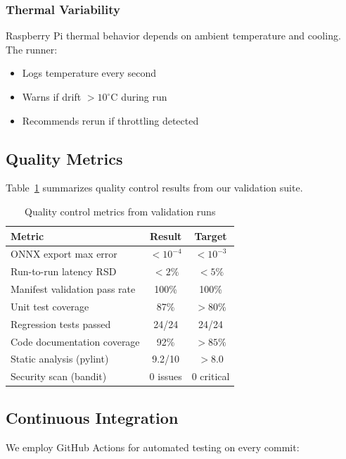 \documentclass[review]{elsarticle}
\begin{document}
\subsubsection{Thermal Variability}

Raspberry Pi thermal behavior depends on ambient temperature and cooling. The runner:

\begin{itemize}
\item Logs temperature every second
\item Warns if drift $> 10^\circ$C during run
\item Recommends rerun if throttling detected
\end{itemize}

\subsection{Quality Metrics}

Table~\ref{tab:quality-metrics} summarizes quality control results from our validation suite.

\begin{table}[h]
\centering
\caption{Quality control metrics from validation runs}
\label{tab:quality-metrics}
\begin{tabular}{lcc}
\toprule
\textbf{Metric} & \textbf{Result} & \textbf{Target} \\
\midrule
ONNX export max error & $< 10^{-4}$ & $< 10^{-3}$ \\
Run-to-run latency RSD & $< 2\%$ & $< 5\%$ \\
Manifest validation pass rate & 100\% & 100\% \\
Unit test coverage & 87\% & $> 80\%$ \\
Regression tests passed & 24/24 & 24/24 \\
Code documentation coverage & 92\% & $> 85\%$ \\
Static analysis (pylint) & 9.2/10 & $> 8.0$ \\
Security scan (bandit) & 0 issues & 0 critical \\
\bottomrule
\end{tabular}
\end{table}

\subsection{Continuous Integration}

We employ GitHub Actions for automated testing on every commit:
\end{document}
